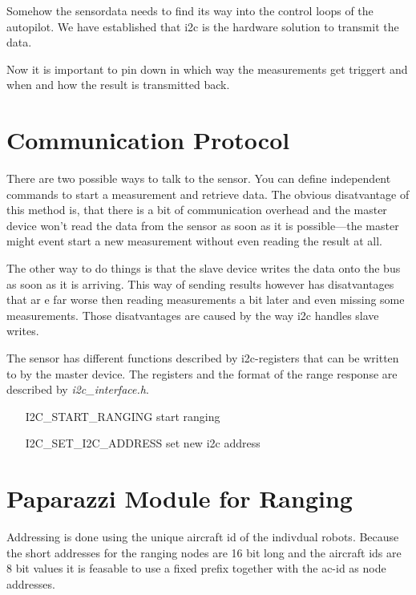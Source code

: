 
Somehow the sensordata needs to find its way into the control loops of the autopilot.
We have established that i2c is the hardware solution to transmit the data.

Now it is important to pin down in which way the measurements get triggert and when and how the result is transmitted back.

\section{Communication Protocol}

There are two possible ways to talk to the sensor.
You can define independent commands to start a measurement and retrieve data.
The obvious disatvantage of this method is, that there is a bit of communication overhead and the master device won't read the data from the sensor as soon as it is possible—the master might event start a new measurement without even reading the result at all.

The other way to do things is that the slave device writes the data onto the bus as soon as it is arriving.
This way of sending results however has disatvantages that ar e far worse then reading measurements a bit later and even missing some measurements.
Those disatvantages are caused by the way i2c handles slave writes.

The sensor has different functions described by i2c-registers that can be written to by the master device.
The registers and the format of the range response are described by \emph{i2c\_interface.h}.

\begin{itemize}
	\item[I2C\_START\_RANGING] start ranging
	\item[I2C\_SET\_I2C\_ADDRESS] set new i2c address
\end{itemize}


\section{Paparazzi Module for Ranging}


Addressing is done using the unique aircraft id of the indivdual robots.
Because the short addresses for the ranging nodes are 16 bit long and the aircraft ids are 8 bit values it is feasable to use a fixed prefix together with the ac-id as node addresses.

